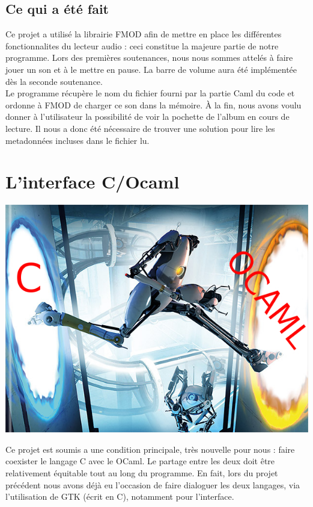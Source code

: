 \documentclass[12pt,a4paper]{report}
\begin{document}
\section{Ce qui a été fait}

Ce projet a utilisé la librairie FMOD afin de mettre en place les différentes fonctionnalites du lecteur audio : ceci constitue la majeure partie de notre programme. Lors des premières soutenances, nous nous sommes attelés à faire jouer un son et à le mettre en pause. La barre de volume aura été implémentée dès la seconde soutenance.\\
Le programme récupère le nom du fichier fourni par la partie Caml du code et ordonne à FMOD de charger ce son dans la mémoire.
À la fin, nous avons voulu donner à l'utilisateur la possibilité de voir la pochette de l'album en cours de lecture. Il nous a donc été nécessaire de trouver une solution pour lire les metadonnées incluses dans le fichier lu.\\



\chapter{L'interface C/Ocaml}

\begin{center}
\includegraphics[scale=0.5]{COcaml.jpg}
\end{center}

Ce projet est soumis a une condition principale, très nouvelle pour nous : faire coexister le langage C avec le OCaml. Le partage entre les deux doit être relativement équitable tout au long du programme. En fait, lors du projet précédent nous avons déjà eu l'occasion de faire dialoguer les deux langages, via l'utilisation de GTK (écrit en C), notamment pour l'interface.\\
\end{document}
